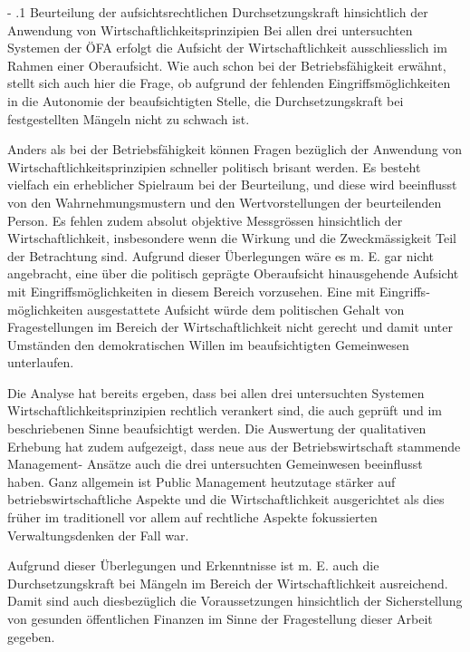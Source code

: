 \documentclass[10pt]{article}
\makeatletter
\renewcommand\paragraph{\@startsection{paragraph}{3}{0mm}{-\baselineskip}{.1\baselineskip}{\normalfont\normalsize\bfseries}}
\renewcommand\paragraph{%
\@startsection{paragraph}{3}{0mm}%
{-\baselineskip}%
{.1\baselineskip}%
{\normalfont\normalsize\bfseries}}
\makeatother
\begin{document}
\paragraph{Beurteilung der aufsichtsrechtlichen Durchsetzungskraft hinsichtlich der Anwendung von Wirtschaftlichkeitsprinzipien}\label{para:beurteilung_der_aufsichtsrechtlichen_durchsetzungskraft_hinsichtlich_der_anwendung_von_wirtschaftlichkeitsprinzipien}
Bei allen drei untersuchten Systemen der ÖFA erfolgt die Aufsicht der Wirtschaftlichkeit ausschliesslich im Rahmen einer Oberaufsicht. Wie auch schon bei der Betriebsfähigkeit erwähnt, stellt sich auch hier die Frage, ob aufgrund der fehlenden Eingriffsmöglichkeiten in die Autonomie der beaufsichtigten Stelle, die Durchsetzungskraft bei festgestellten Mängeln nicht zu schwach ist.

Anders als bei der Betriebsfähigkeit können Fragen bezüglich der Anwendung von Wirtschaftlichkeitsprinzipien schneller politisch brisant werden. Es besteht vielfach ein erheblicher Spielraum bei der Beurteilung, und diese wird beeinflusst von den Wahrnehmungsmustern und den Wertvorstellungen der beurteilenden Person. Es fehlen zudem absolut objektive Messgrössen hinsichtlich der Wirtschaftlichkeit, insbesondere wenn die Wirkung und die Zweckmässigkeit Teil der Betrachtung sind. Aufgrund dieser Überlegungen wäre es m. E. gar nicht angebracht, eine über die politisch geprägte Oberaufsicht hinausgehende Aufsicht mit Eingriffsmöglichkeiten in diesem Bereich vorzusehen. Eine mit Eingriffs­möglich­keiten ausgestattete Aufsicht würde dem politischen Gehalt von Fragestellungen im Bereich der Wirtschaftlichkeit nicht gerecht und damit unter Umständen den demokratischen Willen im beaufsichtigten Gemeinwesen unterlaufen. 

Die Analyse hat bereits ergeben, dass bei allen drei untersuchten Systemen Wirtschaftlich­keits­prinzipien rechtlich verankert sind, die auch geprüft und im beschriebenen Sinne beaufsichtigt werden. Die Auswertung der qualitativen Erhebung hat zudem aufgezeigt, dass neue aus der Betriebswirtschaft stammende Management- Ansätze auch die drei untersuchten Gemeinwesen beeinflusst haben. Ganz allgemein ist Public Management heutzutage stärker auf betriebswirtschaftliche Aspekte und die Wirtschaftlichkeit ausgerichtet als dies früher im traditionell vor allem auf rechtliche Aspekte fokussierten Verwaltungsdenken der Fall war. 

Aufgrund dieser Überlegungen und Erkenntnisse ist m. E. auch die Durchsetzungskraft bei Mängeln im Bereich der Wirtschaftlichkeit ausreichend. Damit sind auch diesbezüglich die Voraussetzungen hinsichtlich der Sicherstellung von gesunden öffentlichen Finanzen im Sinne der Fragestellung dieser Arbeit gegeben.
\end{document}
